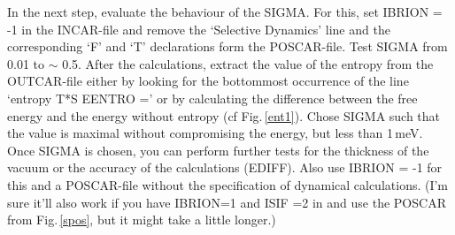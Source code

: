 \documentclass[11pt,oneside,a4paper, captions=nooneline, headsepline]{article}%
\begin{document}
In the next step, evaluate the behaviour of the SIGMA. For this, set IBRION = -1 in the INCAR-file and remove the `Selective Dynamics' line and the corresponding `F' and `T' declarations form the POSCAR-file. Test SIGMA from 0.01 to $\sim$ 0.5. After the calculations, extract the value of the entropy from the OUTCAR-file either by looking for the bottommost occurrence of the line `entropy T*S    EENTRO =' or by calculating the difference between the free energy and the energy without entropy (cf Fig.\,\ref{ent1}). Chose SIGMA such that the value is maximal without compromising the energy, but less than 1\,meV.\\
Once SIGMA is chosen, you can perform further tests for the thickness of the vacuum or the accuracy of the calculations (EDIFF). Also use IBRION = -1 for this and a POSCAR-file without the specification of dynamical calculations. (I'm sure it'll also work if you have IBRION=1 and ISIF =2 in and use the POSCAR from Fig.\,\ref{spos}, but it might take a little longer.)
\end{document}
